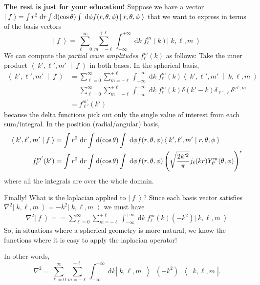 \documentclass[answers]{exam}\newcommand{\repositoryInformationSetup}{     \usepackage[dvipsnames]{xcolor}     \usepackage[ angle=90, color=black, opacity=1, scale=2, ]{background}      \SetBgPosition{current page.west}      \SetBgVshift{-4.5mm}      \backgroundsetup{contents={{\color{green}\texttt{-{}-} differs from commit \texttt{f3526e2} in 0 files}}} } \newcommand{\commit}{{{\color{green}f3526e2}}}\usepackage{amsmath}
\newcommand{\grad}{\ensuremath{\nabla}\xspace}
\providecommand{\id}{}
\renewcommand{\id}[1]{\ensuremath{\; \mathrm{d}#1}}
\newcommand{\ket}[1]{\ensuremath{\left|\;#1\;\right\rangle}}
\newcommand{\bracket}[2]{\ensuremath{\left\langle\;#1\;\middle|\;#2\;\right\rangle}}
\let\braket\bracket
\newcommand{\operator}[3]{\ensuremath{\left|\;#1\;\middle\rangle\; #2\; \middle\langle\;#3\;\right|}}
\begin{document}
\begin{questions}
\begin{parts}
	\end{parts}
	{\bf The rest is just for your education!}
	Suppose we have a vector $\ket{f} = \int r^2 \id{r} \int {\rm d}(\cos\theta) \int \id{\phi} f(r,\theta,\phi) \ket{r,\theta,\phi}$ that we want to express in terms of the basis vectors
	\begin{equation}
		\label{eq:partial wave decomposition}
		\ket{f} = \sum_{\ell=0}^{\infty} \sum_{m=-\ell}^{+\ell} \int_{-\infty}^{+\infty}\id{k}\; f_\ell^m(k) \ket{k, \ell, m}
	\end{equation}
	We can compute the \emph{partial wave amplitudes} $f_\ell^m(k)$ as follows:
	Take the inner product $\braket{k',\ell',m'}{f}$ in both bases.  In the spherical basis,
	\begin{align*}
		\braket{k',\ell',m'}{f}
		 & = \sum_{\ell=0}^{\infty} \sum_{m=-\ell}^{+\ell} \int_{-\infty}^{+\infty}\id{k}\; f_\ell^m(k) \braket{k',\ell',m'}{k, \ell, m}
		\\	&= \sum_{\ell=0}^{\infty} \sum_{m=-\ell}^{+\ell} \int_{-\infty}^{+\infty}\id{k}\; f_\ell^m(k) \delta(k'-k)\delta_{\ell',\ell}\delta^{m',m}
		\\	&= f_{\ell'}^{m'}(k')
	\end{align*}
	because the delta functions pick out only the single value of interest from each sum/integral.
	In the position (radial/angular) basis,
	\begin{align*}
		\braket{k',\ell',m'}{f}
		 & = \int r^2 \id{r} \int {\rm d}(\cos\theta) \int \id{\phi} f(r,\theta,\phi) \braket{k',\ell',m'}{r,\theta,\phi}
		\\
		f_{\ell'}^{m'}(k')
		 & = \int r^2 \id{r} \int {\rm d}(\cos\theta) \int \id{\phi} f(r,\theta,\phi) \left(\sqrt{\frac{2k'^2}{\pi}}j_\ell(k r) Y_{\ell'}^{m}(\theta,\phi)\right)^*
	\end{align*}
	where all the integrals are over the whole domain.

	Finally!  What is the laplacian applied to \ket{f}?  Since each basis vector satisfies $\grad^2\ket{k,\ell,m} = -k^2 \ket{k,\ell,m}$ we must have
	\begin{align}
		\grad^2 \ket{f} =
		= \sum_{\ell=0}^{\infty} \sum_{m=-\ell}^{+\ell} \int_{-\infty}^{+\infty}\id{k}\;  f_\ell^m(k) (-k^2) \ket{k, \ell, m}
	\end{align}
	So, in situations where a spherical geometry is more natural, we know the functions where it is easy to apply the laplacian operator!

	In other words,
	\begin{equation}
		\grad^2 = \sum_{\ell=0}^{\infty} \sum_{m=-\ell}^{+\ell} \int_{-\infty}^{+\infty} \id{k} \operator{k, \ell, m}{(-k^2)}{k,\ell,m}.
	\end{equation}

\end{questions}
\end{document}
